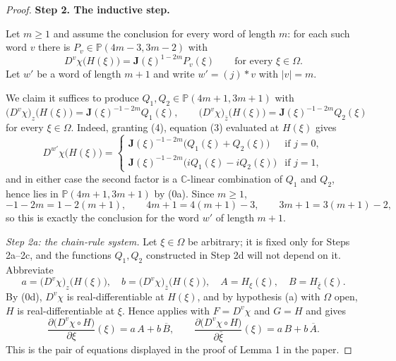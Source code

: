 \begin{proof}
\medskip
\noindent\textbf{Step 2.  The inductive step.}

Let $m\ge1$ and assume the conclusion for every word of length $m$: for each
such word $v$ there is $P_{v}\in\mathbb{P}(4m-3,3m-2)$ with
\begin{equation}\tag{IH}
  D^{v}\chi\bigl(H(\xi)\bigr)=\mathbf{J}(\xi)^{1-2m}P_{v}(\xi)
  \qquad\text{for every }\xi\in\Omega .
\end{equation}
Let $w'$ be a word of length $m+1$ and write $w'=(j)*v$ with $|v|=m$.

We claim it suffices to produce $Q_1,Q_2\in\mathbb{P}(4m+1,3m+1)$ with
\begin{equation}\tag{4}
  \bigl(D^{v}\chi\bigr)_z\bigl(H(\xi)\bigr)=\mathbf{J}(\xi)^{-1-2m}Q_1(\xi),
  \qquad
  \bigl(D^{v}\chi\bigr)_{\bar z}\bigl(H(\xi)\bigr)=\mathbf{J}(\xi)^{-1-2m}Q_2(\xi)
\end{equation}
for every $\xi\in\Omega$.  Indeed, granting (4), equation (3) evaluated at
$H(\xi)$ gives
\[
  D^{w'}\chi\bigl(H(\xi)\bigr)=
  \begin{cases}
    \mathbf{J}(\xi)^{-1-2m}\bigl(Q_1(\xi)+Q_2(\xi)\bigr)&\text{if }j=0,\\
    \mathbf{J}(\xi)^{-1-2m}\bigl(iQ_1(\xi)-iQ_2(\xi)\bigr)&\text{if }j=1,
  \end{cases}
\]
and in either case the second factor is a $\mathbb{C}$-linear combination of
$Q_1$ and $Q_2$, hence lies in $\mathbb{P}(4m+1,3m+1)$ by (0a).  Since
$m\ge1$,
\[
  -1-2m=1-2(m+1),\qquad 4m+1=4(m+1)-3,\qquad 3m+1=3(m+1)-2,
\]
so this is exactly the conclusion for the word $w'$ of length $m+1$.

\emph{Step 2a: the chain-rule system.}  Let $\xi\in\Omega$ be arbitrary; it is
fixed only for Steps 2a--2c, and the functions $Q_1,Q_2$ constructed in Step 2d
will not depend on it.  Abbreviate
\[
  a=\bigl(D^{v}\chi\bigr)_z\bigl(H(\xi)\bigr),\quad
  b=\bigl(D^{v}\chi\bigr)_{\bar z}\bigl(H(\xi)\bigr),\quad
  A=H_\xi(\xi),\quad B=H_{\bar\xi}(\xi).
\]
By (0d), $D^{v}\chi$ is real-differentiable at $H(\xi)$, and by hypothesis (a)
with $\Omega$ open, $H$ is real-differentiable at $\xi$.  Hence
 applies with $F=D^{v}\chi$ and $G=H$ and gives
\begin{equation}\tag{5}
  \frac{\partial\bigl(D^{v}\chi\circ H\bigr)}{\partial\xi}(\xi)=a\,A+b\,\overline{B},
  \qquad
  \frac{\partial\bigl(D^{v}\chi\circ H\bigr)}{\partial\bar\xi}(\xi)=a\,B+b\,\overline{A}.
\end{equation}
This is the pair of equations displayed in the proof of Lemma 1 in the paper.


\end{proof}
